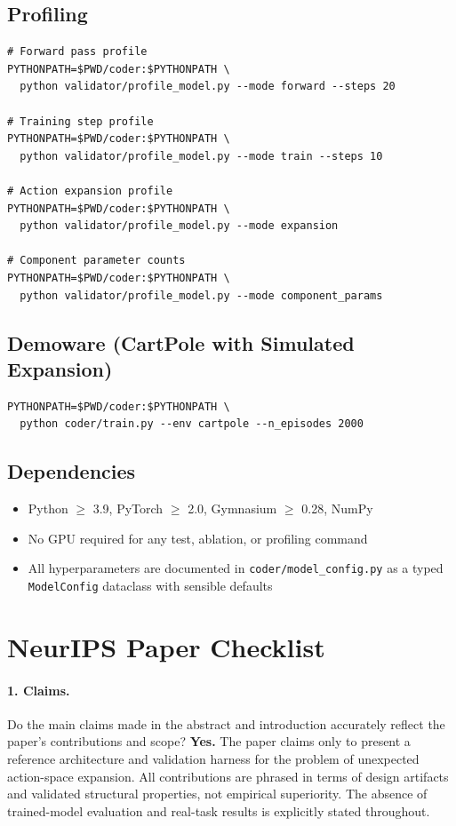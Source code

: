 \documentclass{article}
\begin{document}
\subsection{Profiling}
\begin{verbatim}
# Forward pass profile
PYTHONPATH=$PWD/coder:$PYTHONPATH \
  python validator/profile_model.py --mode forward --steps 20

# Training step profile
PYTHONPATH=$PWD/coder:$PYTHONPATH \
  python validator/profile_model.py --mode train --steps 10

# Action expansion profile
PYTHONPATH=$PWD/coder:$PYTHONPATH \
  python validator/profile_model.py --mode expansion

# Component parameter counts
PYTHONPATH=$PWD/coder:$PYTHONPATH \
  python validator/profile_model.py --mode component_params
\end{verbatim}

\subsection{Demoware (CartPole with Simulated Expansion)}
\begin{verbatim}
PYTHONPATH=$PWD/coder:$PYTHONPATH \
  python coder/train.py --env cartpole --n_episodes 2000
\end{verbatim}

\subsection{Dependencies}
\begin{itemize}
  \item Python $\geq$ 3.9, PyTorch $\geq$ 2.0, Gymnasium $\geq$ 0.28, NumPy
  \item No GPU required for any test, ablation, or profiling command
  \item All hyperparameters are documented in \texttt{coder/model\_config.py}
  as a typed \texttt{ModelConfig} dataclass with sensible defaults
\end{itemize}


\newpage
\section*{NeurIPS Paper Checklist}

\paragraph{1. Claims.}
Do the main claims made in the abstract and introduction accurately reflect the
paper's contributions and scope?
\textbf{Yes.} The paper claims only to present a reference architecture and
validation harness for the problem of unexpected action-space expansion. All
contributions are phrased in terms of design artifacts and validated structural
properties, not empirical superiority. The absence of trained-model evaluation
and real-task results is explicitly stated throughout.
\end{document}
